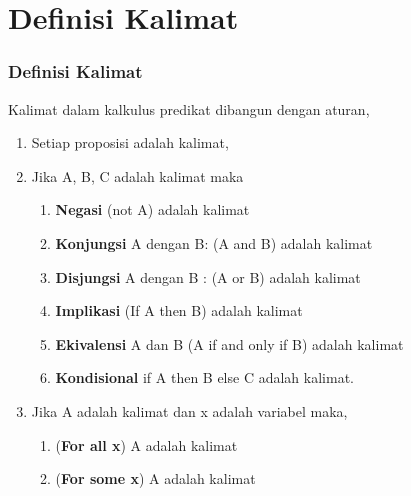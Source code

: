 \documentclass[handout]{beamer}
\theoremstyle{definition}
\theoremstyle{example}
\begin{document}
\section{Definisi Kalimat}
\begin{frame}
	\frametitle{Definisi Kalimat}
      Kalimat dalam kalkulus predikat dibangun dengan aturan,\\
		\begin{enumerate} 
			\item  Setiap proposisi adalah kalimat,
		    \item  Jika A, B, C adalah kalimat maka
		          \begin{enumerate} 
			         \item \textbf{Negasi} (not A) adalah kalimat
					 \item \textbf{Konjungsi} A dengan B: (A and B) adalah kalimat
			         \item \textbf{Disjungsi} A dengan B : (A or B) adalah kalimat
			         \item \textbf{Implikasi} (If A then B) adalah kalimat
			         \item \textbf{Ekivalensi} A dan B (A if and only if B) adalah kalimat
			         \item \textbf{Kondisional} if A then B else C adalah kalimat.
			     \end{enumerate}   
		    \item  Jika A adalah kalimat dan x adalah variabel maka,
		          \begin{enumerate} 
		          	\item (\textbf{For all x}) A adalah kalimat
		          	\item (\textbf{For some x}) A adalah kalimat
		         \end{enumerate} 	
	    \end{enumerate}
\end{frame}
\end{document}
